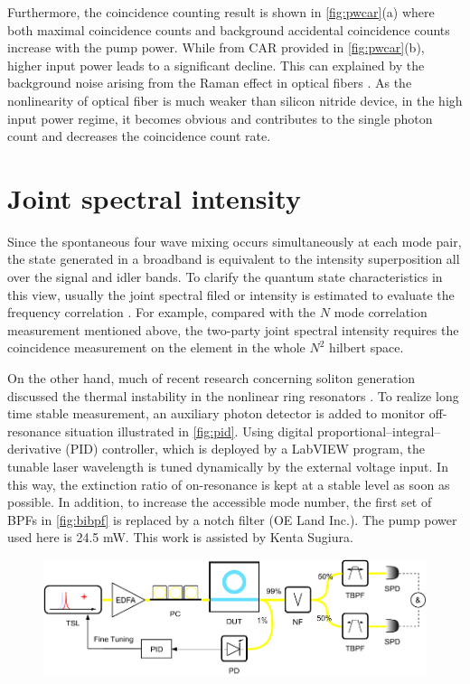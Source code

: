 Furthermore, the coincidence counting result is shown in \autoref{fig:pwcar}(a) where both maximal coincidence counts and background accidental coincidence counts increase with the pump power. While from CAR provided in \autoref{fig:pwcar}(b), higher input power leads to a significant decline. This can explained by the background noise arising from the Raman effect in optical fibers \cite{Engin2012, Sugiura2019}
. As the nonlinearity of optical fiber is much weaker than silicon nitride device, in the high input power regime, it becomes obvious and contributes to the single photon count and decreases the coincidence count rate.

\section{Joint spectral intensity}

Since the spontaneous four wave mixing occurs simultaneously at each mode pair, the state generated in a broadband is equivalent to the intensity superposition all over the signal and idler bands. To clarify the quantum state characteristics in this view, usually the joint spectral filed or intensity is estimated to evaluate the frequency correlation \cites{Helt2010,Vernon2015b}. For example, compared with the $ N $ mode correlation measurement mentioned above, the two-party joint spectral intensity requires the coincidence measurement on the element in the whole $ N^2 $ hilbert space.

On the other hand, much of recent research concerning soliton generation discussed the thermal instability in the nonlinear ring resonators \cites{Guo2017a,Herr2012}. 
To realize long time stable measurement, an auxiliary photon detector is added to monitor off-resonance situation illustrated in \autoref{fig:pid}. Using digital proportional–integral–derivative (PID) controller, which is deployed by a LabVIEW program, the tunable laser wavelength is tuned dynamically by the external voltage input. In this way, the extinction ratio of on-resonance is kept at a stable level as soon as possible. In addition, to increase the accessible mode number, the first set of BPFs in \autoref{fig:bibpf} is replaced by a notch filter (OE Land Inc.). The pump power used here is 24.5 mW. This work is assisted by Kenta Sugiura.

\begin{figure}
	\centering
	\includegraphics[width=1\linewidth]{imgs/pid.pdf}
	\label{fig:pid}
\end{figure}

